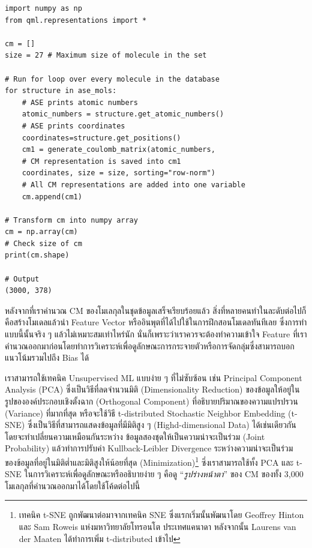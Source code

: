 \begin{lstlisting}[style=MyPython]
import numpy as np
from qml.representations import * 

cm = []
size = 27 # Maximum size of molecule in the set

# Run for loop over every molecule in the database
for structure in ase_mols: 
    # ASE prints atomic numbers 
    atomic_numbers = structure.get_atomic_numbers() 
    # ASE prints coordinates
    coordinates=structure.get_positions() 
    cm1 = generate_coulomb_matrix(atomic_numbers,
    # CM representation is saved into cm1
    coordinates, size = size, sorting="row-norm") 
    # All CM representations are added into one variable
    cm.append(cm1) 

# Transform cm into numpy array
cm = np.array(cm) 
# Check size of cm
print(cm.shape)

# Output
(3000, 378)
\end{lstlisting}

\vspace{1em}

หลังจากที่เราคำนวณ CM ของโมเลกุลในชุดข้อมูลเสร็จเรียบร้อยแล้ว สิ่งที่หลายคนทำในละดับต่อไปก็คือสร้างโมเดลแล้วนำ Feature Vector 
หรืออินพุตที่ได้ไปใช้ในการฝึกสอนโมเดลทันทีเลย ซึ่งการทำแบบนี้นั้นจริง ๆ แล้วไม่เหมาะสมเท่าไหร่นัก นั่นก็เพราะว่าเราควรจะต้องทำความเข้าใจ 
Feature ที่เราคำนวณออกมาก่อนโดยทำการวิเคราะห์เพื่อดูลักษณะการกระจายตัวหรือการจัดกลุ่มซึ่งสามารถบอกแนวโน้มรวมไปถึง Bias ได้

เราสามารถใช้เทคนิค Unsupervised ML แบบง่าย ๆ ที่ไม่ซับซ้อน เช่น Principal Component Analysis (PCA) ซึ่งเป็นวิธีที่ลดจำนวนมิติ 
(Dimensionality Reduction) ของข้อมูลให้อยู่ในรูปขององค์ประกอบเชิงตั้งฉาก (Orthogonal Component) ที่อธิบายปริมาณของความแปรปรวน
(Variance) ที่มากที่สุด หรือจะใช้วิธี t-distributed Stochastic Neighbor Embedding (t-SNE) ซึ่งเป็นวิธีที่สามารถแสดงข้อมูลที่มีมิติสูง ๆ 
(Highd-dimensional Data) ได้เช่นเดียวกัน\autocite{JMLR:v9:vandermaaten08a,belkina2019} โดยจะทำเปลี่ยนความเหมือนกันระหว่าง%
ข้อมูลสองชุดให้เป็นความน่าจะเป็นร่วม (Joint Probability) แล้วทำการปรับค่า Kullback-Leibler Divergence ระหว่างความน่าจะเป็นร่วม%
ของข้อมูลที่อยู่ในมิติต่ำและมิติสูงให้น้อยที่สุด (Minimization)\footnote{เทคนิค t-SNE ถูกพัฒนาต่อมาจากเทคนิค SNE ซึ่งแรกเริ่มนั้นพัฒนาโดย
Geoffrey Hinton และ Sam Roweis แห่งมหาวิทยาลัยโทรอนโต ประเทศแคนาดา\autocite{NIPS2002_6150ccc6} หลังจากนั้น Laurens 
van der Maaten ได้ทำการเพิ่ม t-distributed เข้าไป} ซึ่งเราสามารถใช้ทั้ง PCA และ t-SNE ในการวิเคราะห์เพื่อดูลักษณะหรืออธิบายง่าย ๆ 
คือดู \enquote{\textit{รูปร่างหน้าตา}} ของ CM ของทั้ง 3,000 โมเลกุลที่คำนวณออกมาได้โดยใช้โค้ดต่อไปนี้

